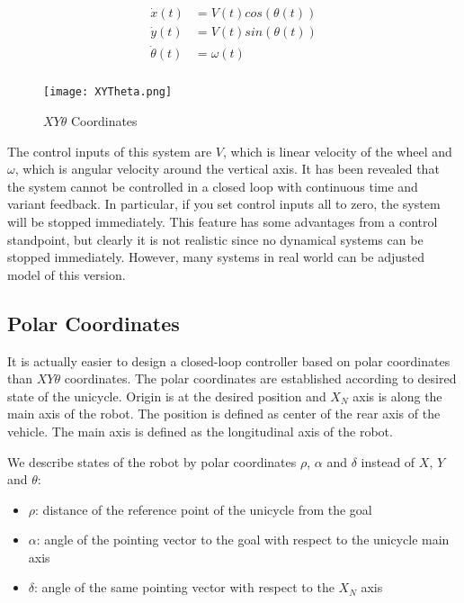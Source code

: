 ﻿\documentclass[twoside]{article}
\begin{document}
\begin{equation} \label{xytheta}
\begin{split}
\dot{x}(t) &= V(t) cos(\theta(t)) \\
\dot{y}(t) &= V(t) sin(\theta(t)) \\
\dot{\theta}(t) &= \omega(t)  \\
\end{split}
\end{equation}

\begin{figure}[h]
\centering
\texttt{[image: XYTheta.png]}
\caption{$XY\theta$ Coordinates}
\label{XYThetaFigure}
\end{figure}

The control inputs of this system are $V$, which is linear velocity of the wheel and $\omega$, which is angular velocity around the vertical axis. It has been revealed that the system cannot be controlled in a closed loop with continuous time and variant feedback. In particular, if you set control inputs all to zero, the system will be stopped immediately. This feature has some advantages from a control standpoint, but clearly it is not realistic since no dynamical systems can be stopped immediately. However, many systems in real world can be adjusted model of this version.

\subsection{Polar Coordinates}
It is actually easier to design a closed-loop controller based on polar coordinates than $XY\theta$ coordinates. The polar coordinates are established according to desired state of the unicycle. Origin is at the desired position and $X_N$ axis is along the main axis of the robot. The position is defined as center of the rear axis of the vehicle. The main axis is defined as the longitudinal axis of the robot.

We describe states of the robot by polar coordinates $\rho$, $\alpha$ and $\delta$ instead of $X$, $Y$ and $\theta$:
\begin{itemize}
  \item $\rho$: distance of the reference point of the unicycle from the goal
  \item $\alpha$: angle of the pointing vector to the goal with respect to the unicycle main axis
  \item $\delta$: angle of the same pointing vector with respect to the $X_N$ axis
\end{itemize}
\end{document}
